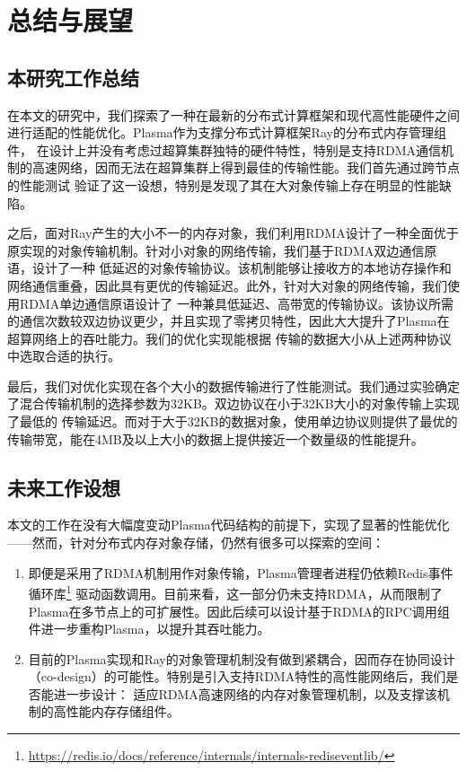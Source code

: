 \chapter{总结与展望}

\section{本研究工作总结}

在本文的研究中，我们探索了一种在最新的分布式计算框架和现代高性能硬件之间进行适配的性能优化。Plasma作为支撑分布式计算框架Ray的分布式内存管理组件，
在设计上并没有考虑过超算集群独特的硬件特性，特别是支持RDMA通信机制的高速网络，因而无法在超算集群上得到最佳的传输性能。我们首先通过跨节点的性能测试
验证了这一设想，特别是发现了其在大对象传输上存在明显的性能缺陷。

之后，面对Ray产生的大小不一的内存对象，我们利用RDMA设计了一种全面优于原实现的对象传输机制。针对小对象的网络传输，我们基于RDMA双边通信原语，设计了一种
低延迟的对象传输协议。该机制能够让接收方的本地访存操作和网络通信重叠，因此具有更优的传输延迟。此外，针对大对象的网络传输，我们使用RDMA单边通信原语设计了
一种兼具低延迟、高带宽的传输协议。该协议所需的通信次数较双边协议更少，并且实现了零拷贝特性，因此大大提升了Plasma在超算网络上的吞吐能力。我们的优化实现能根据
传输的数据大小从上述两种协议中选取合适的执行。

最后，我们对优化实现在各个大小的数据传输进行了性能测试。我们通过实验确定了混合传输机制的选择参数为32KB。双边协议在小于32KB大小的对象传输上实现了最低的
传输延迟。而对于大于32KB的数据对象，使用单边协议则提供了最优的传输带宽，能在4MB及以上大小的数据上提供接近一个数量级的性能提升。

\section{未来工作设想}

本文的工作在没有大幅度变动Plasma代码结构的前提下，实现了显著的性能优化——然而，针对分布式内存对象存储，仍然有很多可以探索的空间：

\begin{enumerate}
	\item 即便是采用了RDMA机制用作对象传输，Plasma管理者进程仍依赖Redis事件循环库\footnote{\url{https://redis.io/docs/reference/internals/internals-rediseventlib/}}
	驱动函数调用。目前来看，这一部分仍未支持RDMA，从而限制了Plasma在多节点上的可扩展性。因此后续可以设计基于RDMA的RPC调用组件进一步重构Plasma，以提升其吞吐能力。
	\item 目前的Plasma实现和Ray的对象管理机制\cite{wang2021ownership}没有做到紧耦合，因而存在协同设计（co-design）的可能性。特别是引入支持RDMA特性的高性能网络后，我们是否能进一步设计：
	适应RDMA高速网络的内存对象管理机制，以及支撑该机制的高性能内存存储组件。
\end{enumerate}